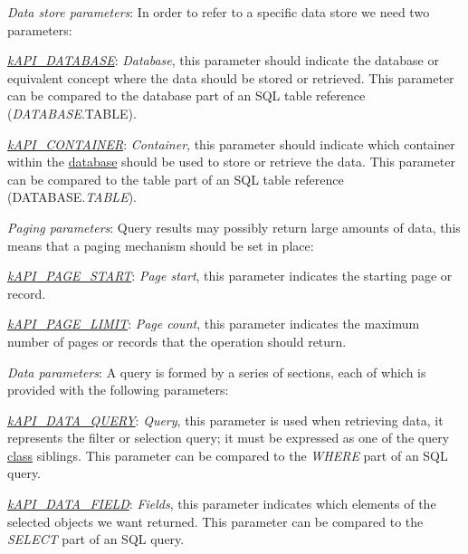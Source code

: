 \begin{DoxyItemize}
\item {\itshape Data store parameters\/}\-: In order to refer to a specific data store we need two parameters\-: 
\begin{DoxyItemize}
\item {\itshape \hyperlink{}{k\-A\-P\-I\-\_\-\-D\-A\-T\-A\-B\-A\-S\-E}\/}\-: {\itshape Database\/}, this parameter should indicate the database or equivalent concept where the data should be stored or retrieved. This parameter can be compared to the database part of an S\-Q\-L table reference ({\itshape D\-A\-T\-A\-B\-A\-S\-E\/}.T\-A\-B\-L\-E). 
\item {\itshape \hyperlink{}{k\-A\-P\-I\-\_\-\-C\-O\-N\-T\-A\-I\-N\-E\-R}\/}\-: {\itshape Container\/}, this parameter should indicate which container within the \hyperlink{}{database} should be used to store or retrieve the data. This parameter can be compared to the table part of an S\-Q\-L table reference (D\-A\-T\-A\-B\-A\-S\-E.{\itshape T\-A\-B\-L\-E\/}). 
\end{DoxyItemize}
\item {\itshape Paging parameters\/}\-: Query results may possibly return large amounts of data, this means that a paging mechanism should be set in place\-: 
\begin{DoxyItemize}
\item {\itshape \hyperlink{}{k\-A\-P\-I\-\_\-\-P\-A\-G\-E\-\_\-\-S\-T\-A\-R\-T}\/}\-: {\itshape Page start\/}, this parameter indicates the starting page or record. 
\item {\itshape \hyperlink{}{k\-A\-P\-I\-\_\-\-P\-A\-G\-E\-\_\-\-L\-I\-M\-I\-T}\/}\-: {\itshape Page count\/}, this parameter indicates the maximum number of pages or records that the operation should return. 
\end{DoxyItemize}
\item {\itshape Data parameters\/}\-: A query is formed by a series of sections, each of which is provided with the following parameters\-: 
\begin{DoxyItemize}
\item {\itshape \hyperlink{}{k\-A\-P\-I\-\_\-\-D\-A\-T\-A\-\_\-\-Q\-U\-E\-R\-Y}\/}\-: {\itshape Query\/}, this parameter is used when retrieving data, it represents the filter or selection query; it must be expressed as one of the query \hyperlink{class_c_query}{class} siblings. This parameter can be compared to the {\itshape W\-H\-E\-R\-E\/} part of an S\-Q\-L query. 
\item {\itshape \hyperlink{}{k\-A\-P\-I\-\_\-\-D\-A\-T\-A\-\_\-\-F\-I\-E\-L\-D}\/}\-: {\itshape Fields\/}, this parameter indicates which elements of the selected objects we want returned. This parameter can be compared to the {\itshape S\-E\-L\-E\-C\-T\/} part of an S\-Q\-L query. 

\end{DoxyItemize}
\end{DoxyItemize}
